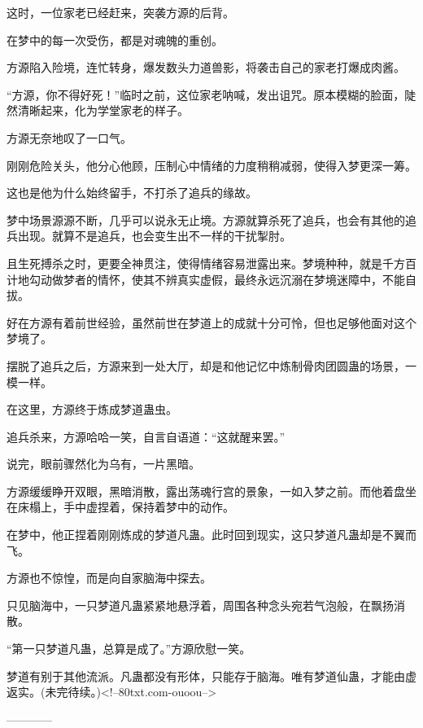\begin{this_body}
这时，一位家老已经赶来，突袭方源的后背。

在梦中的每一次受伤，都是对魂魄的重创。

方源陷入险境，连忙转身，爆发数头力道兽影，将袭击自己的家老打爆成肉酱。

“方源，你不得好死！”临时之前，这位家老呐喊，发出诅咒。原本模糊的脸面，陡然清晰起来，化为学堂家老的样子。

方源无奈地叹了一口气。

刚刚危险关头，他分心他顾，压制心中情绪的力度稍稍减弱，使得入梦更深一筹。

这也是他为什么始终留手，不打杀了追兵的缘故。

梦中场景源源不断，几乎可以说永无止境。方源就算杀死了追兵，也会有其他的追兵出现。就算不是追兵，也会变生出不一样的干扰掣肘。

且生死搏杀之时，更要全神贯注，使得情绪容易泄露出来。梦境种种，就是千方百计地勾动做梦者的情怀，使其不辨真实虚假，最终永远沉溺在梦境迷障中，不能自拔。

好在方源有着前世经验，虽然前世在梦道上的成就十分可怜，但也足够他面对这个梦境了。

摆脱了追兵之后，方源来到一处大厅，却是和他记忆中炼制骨肉团圆蛊的场景，一模一样。

在这里，方源终于炼成梦道蛊虫。

追兵杀来，方源哈哈一笑，自言自语道：“这就醒来罢。”

说完，眼前骤然化为乌有，一片黑暗。

方源缓缓睁开双眼，黑暗消散，露出荡魂行宫的景象，一如入梦之前。而他着盘坐在床榻上，手中虚捏着，保持着梦中的动作。

在梦中，他正捏着刚刚炼成的梦道凡蛊。此时回到现实，这只梦道凡蛊却是不翼而飞。

方源也不惊惶，而是向自家脑海中探去。

只见脑海中，一只梦道凡蛊紧紧地悬浮着，周围各种念头宛若气泡般，在飘扬消散。

“第一只梦道凡蛊，总算是成了。”方源欣慰一笑。

梦道有别于其他流派。凡蛊都没有形体，只能存于脑海。唯有梦道仙蛊，才能由虚返实。(未完待续。)<!--80txt.com-ouoou-->

------------

\end{this_body}

